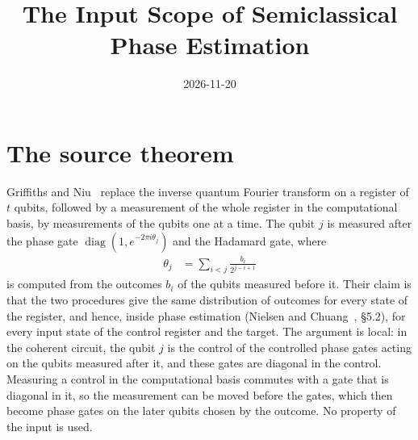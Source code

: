 \documentclass{article}
\title{The Input Scope of Semiclassical Phase Estimation}
\author{}
\date{2026-11-20}
\begin{document}
\maketitle
{}

\section{The source theorem}
Griffiths and Niu~\cite{GriffithsNiu1996} replace the inverse quantum Fourier
transform on a register of $t$ qubits, followed by a measurement of the whole
register in the computational basis, by measurements of the qubits one at a
time. The qubit $j$ is measured after the phase gate
$\operatorname{diag}(1,e^{-2\pi i\theta_j})$ and the Hadamard gate, where
\begin{align}
    \theta_j & = \sum_{i<j}\frac{b_i}{2^{j-i+1}}
    \label{eq:gn96_semiclassical_general_input_scope_correction}
\end{align}
is computed from the outcomes $b_i$ of the qubits measured before it. Their
claim is that the two procedures give the same distribution of outcomes for
every state of the register, and hence, inside phase estimation
(Nielsen and Chuang~\cite{NielsenChuang2010}, \S5.2), for every input state
of the control register and the target. The argument is local: in the coherent
circuit, the qubit $j$ is the control of the controlled phase gates acting on
the qubits measured after it, and these gates are diagonal in the control.
Measuring a control in the computational basis commutes with a gate that is
diagonal in it, so the measurement can be moved before the gates, which then
become phase gates on the later qubits chosen by the outcome. No property of
the input is used.
\end{document}
